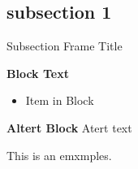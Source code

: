 \subsection{subsection 1}

\begin{frame}{Subsection Frame Title}

\begin{block}{\textbf{Block Text}}
    \begin{itemize}
        \item Item in Block
    \end{itemize}
\end{block}

\begin{alertblock}{\textbf{Altert Block}}
    Atert text
\end{alertblock}

\begin{examples}
    This is an emxmples.
\end{examples}
    
\end{frame}